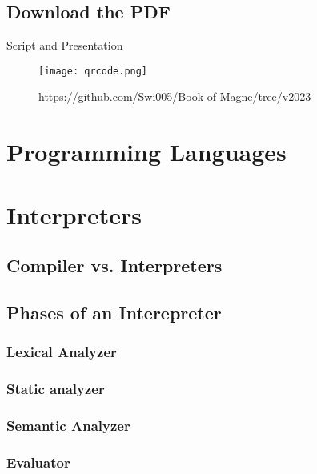 \begin{frame}[t,plain]
    \titlepage
\end{frame}

\subsection*{Download the PDF}
\begin{frame}{Script and Presentation}
    \begin{figure}
        \centering
        \texttt{[image: qrcode.png]}
        \caption{https://github.com/Swi005/Book-of-Magne/tree/v2023}
        \label{fig:qrcode}
    \end{figure}
\end{frame}

\section{Programming Languages}



\section{Interpreters}


\subsection*{Compiler vs. Interpreters}
\subsection{Phases of an Interepreter}
\subsubsection{Lexical Analyzer}
\subsubsection*{Static analyzer}
\subsubsection*{Semantic Analyzer}
\subsubsection*{Evaluator}
